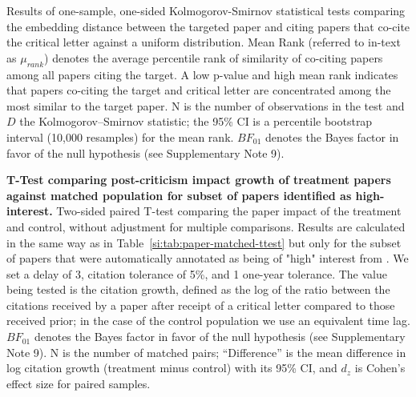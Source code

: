 \documentclass[12pt]{article} %
\begin{document}
\begin{table}[ht]
\scriptsize
\centering
\caption{
Results of one-sample, one-sided Kolmogorov-Smirnov statistical tests comparing the embedding distance between the targeted paper and citing papers that co-cite the critical letter against a uniform distribution. 
Mean Rank (referred to in-text as $\mu_{rank}$) denotes the average percentile rank of similarity of co-citing papers among all papers citing the target. A low p-value and high mean rank indicates that papers co-citing the target and critical letter are concentrated among the most similar to the target paper. N is the number of observations in the test and $D$ the Kolmogorov–Smirnov statistic; the 95\% CI is a percentile bootstrap interval (10,000 resamples) for the mean rank.
$BF_{01}$ denotes the Bayes factor in favor of the null hypothesis (see Supplementary Note 9).
}
\label{si:table:embedding_tests_extra}
%
\end{table}




\begin{table}[ht]
\small
\centering
\caption{
\textbf{T-Test comparing post-criticism impact growth of treatment papers against matched population for subset of papers identified as high-interest.}
Two-sided paired T-test comparing the paper impact of the treatment and control, without adjustment for multiple comparisons.
Results are calculated in the same way as in Table~\ref{si:tab:paper-matched-ttest} but only for the subset of papers that were automatically annotated as being of "high" interest from .
We set a delay of 3, citation tolerance of 5\%, and 1 one-year tolerance. 
The value being tested is the citation growth, defined as the log of the ratio between the citations received by a paper after receipt of a critical letter compared
to those received prior; in the case of the control population we use an equivalent time lag.
$BF_{01}$ denotes the Bayes factor in favor of the null hypothesis (see Supplementary Note 9).
N is the number of matched pairs; ``Difference'' is the mean difference in log citation growth (treatment minus control) with its 95\% CI, and $d_z$ is Cohen's effect size for paired samples.
}
\label{si:table:high-interest-analysis}
%
\end{table}
\end{document}
